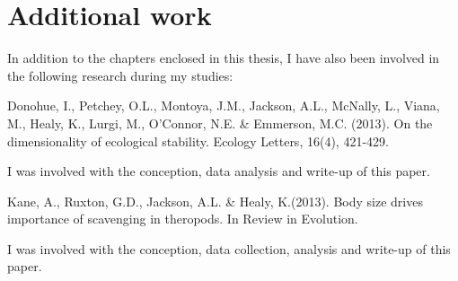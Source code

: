 \section{\uppercase{A}dditional work}
In addition to the chapters enclosed in this thesis, I have also been involved in the following research during my studies:\\

\begin{singlespace}
Donohue, I., Petchey, O.L., Montoya, J.M., Jackson, A.L., McNally, L., Viana, M., Healy, K., Lurgi, M., O’Connor, N.E. \& Emmerson, M.C. (2013). On the dimensionality of ecological stability. Ecology Letters, 16(4), 421-429. \\
\end{singlespace}

\noindent
I was involved with the conception, data analysis and write-up of this paper. \\

\begin{singlespace}
Kane, A., Ruxton, G.D., Jackson, A.L. \& Healy, K.(2013). Body size drives importance of scavenging in theropods. In Review in Evolution. \\
\end{singlespace}

\noindent
I was involved with the conception, data collection, analysis and write-up of this paper. \\



%
%

